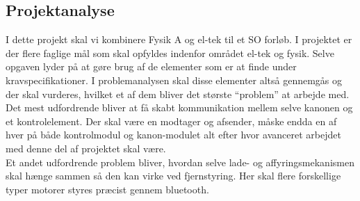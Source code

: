 \subsection{Projektanalyse}

I dette projekt skal vi kombinere Fysik A og el-tek til et SO forløb. I projektet er der flere faglige mål som skal opfyldes indenfor området el-tek og fysik. Selve opgaven lyder på at gøre brug af de elementer som er at finde under kravspecifikationer. I problemanalysen skal disse elementer altså gennemgås og der skal vurderes, hvilket et af dem bliver det største “problem” at arbejde med.\\

Det mest udfordrende bliver at få skabt kommunikation mellem selve kanonen og et kontrolelement. Der skal være en modtager og afsender, måske endda en af hver på både kontrolmodul og kanon-modulet alt efter hvor avanceret arbejdet med denne del af projektet skal være.\\

Et andet udfordrende problem bliver, hvordan selve lade- og affyringsmekanismen skal hænge sammen så den kan virke ved fjernstyring. Her skal flere forskellige typer motorer styres præcist gennem bluetooth.
